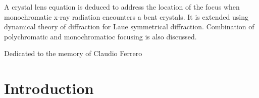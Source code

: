 \documentclass[preprint]{iucr}              %
\begin{document}
\maketitle                        %

\begin{synopsis}
A crystal lens equation is deduced to address the location of the focus when monochromatic x-ray radiation encounters a bent crystals. It is extended using dynamical theory of diffraction for Laue symmetrical diffraction. Combination of polychromatic and monochromatioc focusing is also discussed. 
\end{synopsis}

\begin{flushright}
{Dedicated to the memory of Claudio Ferrero}
\end{flushright}

\begin{abstract}
The location of the beam focus produced when monochromatic x-ray radiation is diffracted by a bent crystals is predicted by the crystal lens equation. We derive this equation on the basis of geometrical concepts. This equation has little utility for diffraction in Laue geometry. The formation of focii for the Laue symmetrical case is discussed using concepts of dynamical theory and an extension of the lens equation is proposed. The existence of additional polychromatic focus is analyzed and the feasibility of matching focal positions by polychromatic and monochromatic focusing is discussed.   
\end{abstract}



\section{Introduction}
\end{document}
